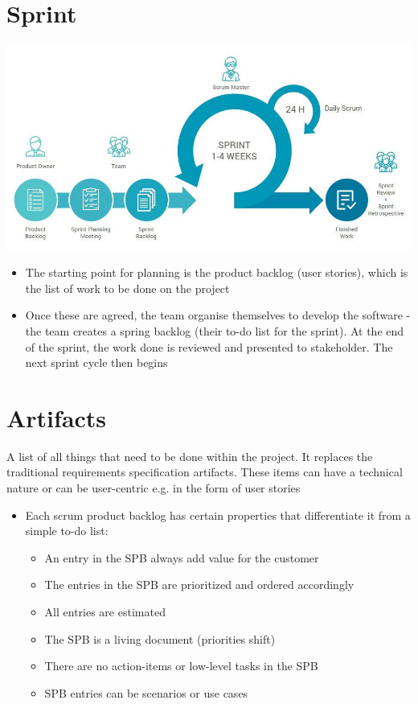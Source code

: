 \documentclass{article}[18pt]
\begin{document}
\section{Sprint}
\begin{center}
	\includegraphics[scale=0.7]{sprint}
\end{center}
\begin{itemize}
	\item The starting point for planning is the product backlog (user stories), which is the list of work to be done on the project
	\item Once these are agreed, the team organise themselves to develop the software - the team creates a spring backlog (their to-do list for the sprint). At the end of the sprint, the work done is reviewed and presented to stakeholder. The next sprint cycle then begins
\end{itemize}
\section{Artifacts}
\begin{definition}
	A list of all things that need to be done within the project. It replaces the traditional requirements specification artifacts. These items can have a technical nature or can be user-centric e.g. in the form of user stories
\end{definition}
\begin{itemize}
	\item Each scrum product backlog has certain properties that differentiate it from a simple to-do list:
	\begin{itemize}
		\item An entry in the SPB always add value for the customer
		\item The entries in the SPB are prioritized and ordered accordingly
		\item All entries are estimated
		\item The SPB is a living document (priorities shift)
		\item There are no action-items or low-level tasks in the SPB
		\item SPB entries can be scenarios or use cases
	\end{itemize}
\end{itemize}
\end{document}
